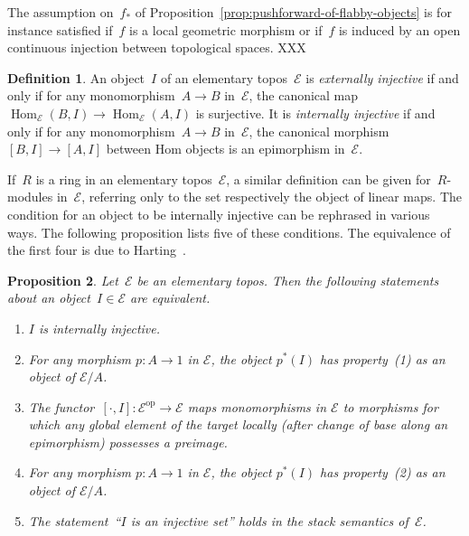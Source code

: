 \documentclass[oneside]{amsart}
\theoremstyle{definition}
\newtheorem{defn}{Definition}[section]
\theoremstyle{plain}
\newtheorem{prop}[defn]{Proposition}
\theoremstyle{remark}
\newcommand{\E}{\mathcal{E}}
\newcommand{\op}{\mathrm{op}}
\DeclareMathOperator{\Hom}{Hom}
\renewcommand{\_}{\mathpunct{.}\,}
\begin{document}
The assumption on~$f_*$ of Proposition~\ref{prop:pushforward-of-flabby-objects}
is for instance satisfied if~$f$ is a local geometric morphism or if~$f$ is
induced by an open continuous injection between topological spaces. XXX

\begin{defn}An object~$I$ of an elementary topos~$\E$ is \emph{externally
injective} if and only if for any monomorphism~$A \to B$ in~$\E$, the canonical
map~$\Hom_\E(B,I) \to \Hom_\E(A,I)$ is surjective. It is \emph{internally
injective} if and only if for any monomorphism~$A \to B$ in~$\E$, the canonical
morphism~$[B,I] \to [A,I]$ between Hom objects is an epimorphism in~$\E$.
\end{defn}

If~$R$ is a ring in an elementary topos~$\E$, a similar definition can be given
for~$R$-modules in~$\E$, referring only to the set respectively the object of
linear maps. The condition for an object to be internally injective can be
rephrased in various ways. The following proposition lists five of these
conditions. The equivalence of the first four is due to
Harting~\cite{harting:locally-injective}.

\begin{prop}\label{prop:notions-of-internal-injectivity}
Let~$\E$ be an elementary topos. Then the following statements about an
object~$I \in \E$ are equivalent.
\begin{enumerate}
\item[(1)] $I$ is internally injective.
\item[(1')] For any morphism $p : A \to 1$ in $\E$, the object $p^*(I)$ has property~(1)
as an object of $\E/A$.
\item[(2)] The functor~$[\cdot, I] : \E^\op \to \E$ maps monomorphisms in $\E$
to morphisms for which any global element of the target locally (after change of
base along an epimorphism) possesses a preimage.
\item[(2')] For any morphism $p : A \to 1$ in $\E$, the object $p^*(I)$ has property~(2)
as an object of $\E/A$.
\item[(3)] The statement~``$I$ is an injective set'' holds in the stack
semantics of~$\E$.
\end{enumerate}
\end{prop}
\end{document}
